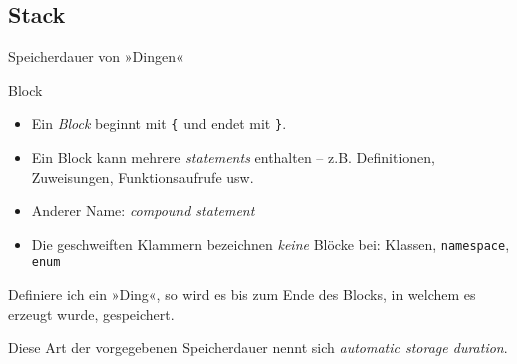 \subsection{Stack}

\newcommand{\stackframe}[3]{
	\begin{frame}[t]{#1}
		\begin{columns}
			\column[t]{0.25\textwidth}
				\ifthenelse{ \equal{#2}{\empty} }{}
				{
					\texttt{[image: images/\#2]}
				}
			
			\column[t]{0.75\textwidth}
				\begin{block}{}
					#3
				\end{block}
		\end{columns}
	\end{frame}
}



\begin{frame}[fragile]{Speicherdauer von »Dingen«}
	\begin{block}{Block}
		\begin{itemize}
			\item Ein \emph{Block} beginnt mit \verb|{| und endet mit \verb|}|.
			\item {\footnotesize Ein Block kann mehrere \emph{statements} enthalten -- z.B. Definitionen, Zuweisungen, Funktionsaufrufe usw.}
			\item {\footnotesize Anderer Name: \emph{compound statement}}
			\item {\footnotesize Die geschweiften Klammern bezeichnen \emph{keine} Blöcke bei: Klassen, \verb|namespace|, \verb|enum|}
		\end{itemize}
	\end{block}
	
	\pause
	\vspace{1em}
	
	Definiere ich ein »Ding«, so wird es bis zum Ende des Blocks, in welchem es erzeugt wurde, gespeichert.
	
	\vspace{0.5em}
	
	Diese Art der vorgegebenen Speicherdauer nennt sich \emph{automatic storage duration}.
\end{frame}

